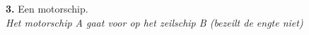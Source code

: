 \vspace{-0.7cm}

\begin{figure}[H]
	\centering
	\hspace{0.02\textwidth}
	\begin{minipage}[t]{0.70\textwidth}
		\textbf{3.} Een motorschip.\\
		\textit{Het motorschip A gaat voor op het zeilschip B (bezeilt de engte niet)}
	\end{minipage}
	\hfill
	\begin{minipage}[t]{0.25\textwidth}
		\label{pic:engte:5}
	\end{minipage}
	\hfill
\end{figure}

\vspace{-0.7cm}


